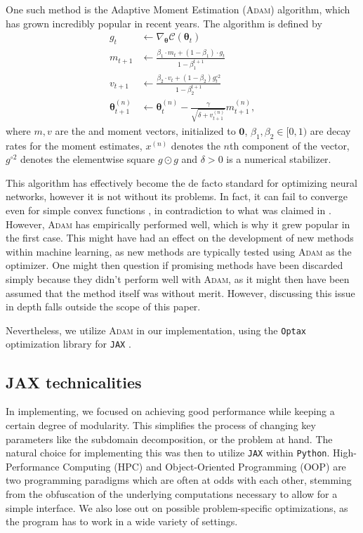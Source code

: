 One such method is the Adaptive Moment Estimation (\textsc{Adam}) \cite{kingma2017adam} algorithm, which has grown incredibly popular in recent years.
The algorithm is defined by
\begin{equation}
\begin{split}
    g_{t} &\gets \nabla_{\boldsymbol{\theta}}\mathcal{C}(\boldsymbol{\theta}_t) \\
    m_{t+1} &\gets \frac{\beta_1 \cdot m_t + (1-\beta_1) \cdot g_t}{1 - \beta_1^{t+1}} \\
    v_{t+1} &\gets \frac{\beta_2 \cdot v_t + (1 - \beta_2)g_t^{\circ 2}}{1 - \beta_2^{t+1}} \\
    \boldsymbol{\theta}_{t+1}^{(n)} &\gets \boldsymbol{\theta}_t^{(n)} - \frac{\gamma}{\sqrt{\delta + v_{t+1}^{(n)}}} m_{t+1}^{(n)},
\end{split}
\end{equation}
where $m, v$ are the  and  moment vectors, initialized to $\boldsymbol{0}$, $\beta_1, \beta_2 \in [0,1)$ are decay rates for the moment estimates, $x^{(n)}$ denotes the $n$th component of the vector, $g^{\circ 2}$ denotes the elementwise square $g \odot g$ and $\delta > 0$ is a numerical stabilizer. 

This algorithm has effectively become the de facto standard for optimizing neural networks, however it is not without its problems.
In fact, it can fail to converge even for simple convex functions \cite{reddi2019convergence}, in contradiction to what was claimed in \cite{kingma2017adam}.
However, \textsc{Adam} has empirically performed well, which is why it grew popular in the first case.
This might have had an effect on the development of new methods within machine learning, as new methods are typically tested using \textsc{Adam} as the optimizer.
One might then question if promising methods have been discarded simply because they didn't perform well with \textsc{Adam}, as it might then have been assumed that the method itself was without merit.
However, discussing this issue in depth falls outside the scope of this paper.

Nevertheless, we utilize \textsc{Adam} in our implementation, using the \verb|Optax| \cite{deepmind2020jax} optimization library for \verb|JAX| \cite{jax2018github}.

\subsection{JAX technicalities}\label{sec:JAX}
In implementing, we focused on achieving good performance while keeping a certain degree of modularity.
This simplifies the process of changing key parameters like the subdomain decomposition, or the problem at hand.
The natural choice for implementing this was then to utilize \verb|JAX| \cite{jax2018github} within \verb|Python|.
High-Performance Computing (HPC) and Object-Oriented Programming (OOP) are two programming paradigms which are often at odds with each other, stemming from the obfuscation of the underlying computations necessary to allow for a simple interface.
We also lose out on possible problem-specific optimizations, as the program has to work in a wide variety of settings.

